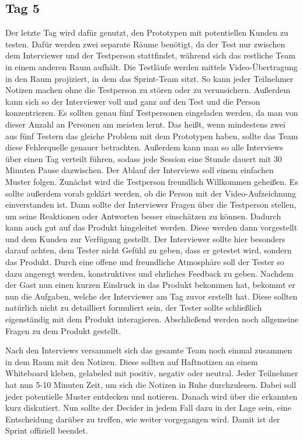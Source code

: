 \subsection*{Tag 5}
Der letzte Tag wird dafür genutzt, den Prototypen mit potentiellen Kunden zu testen. Dafür werden zwei separate Räume benötigt, da der Test nur zwischen dem Interviewer und der Testperson stattfindet, während sich das restliche Team in einem anderen Raum aufhält. Die Testläufe werden mittels Video-Übertragung in den Raum projiziert, in dem das Sprint-Team sitzt. So kann jeder Teilnehmer Notizen machen ohne die Testperson zu stören oder zu verunsichern. Außerdem kann sich so der Interviewer voll und ganz auf den Test und die Person konzentrieren. Es sollten genau fünf Testpersonen eingeladen werden, da man von dieser Anzahl an Personen am meisten lernt. Das heißt, wenn mindestens zwei aus fünf Testern das gleiche Problem mit dem Prototypen haben, sollte das Team diese Fehlerquelle genauer betrachten.
Außerdem kann man so alle Interviews über einen Tag verteilt führen, sodass jede Session eine Stunde dauert mit 30 Minuten Pause dazwischen. Der Ablauf der Interviews soll einem einfachen Muster folgen. Zunächst wird die Testperson freundlich Willkommen geheißen. Es sollte außerdem vorab geklärt werden, ob die Person mit der Video-Aufzeichnung einverstanden ist. Dann sollte der Interviewer Fragen über die Testperson stellen, um seine Reaktionen oder Antworten besser einschätzen zu können. Dadurch kann auch gut auf das Produkt hingeleitet werden. Diese werden dann vorgestellt und dem Kunden zur Verfügung gestellt. Der Interviewer sollte hier besonders darauf achten, dem Tester nicht Gefühl zu geben, dass er getestet wird, sondern das Produkt. Durch eine offene und freundliche Atmosphäre soll der Tester so dazu angeregt werden, konstruktives und ehrliches Feedback zu geben. Nachdem der Gast nun einen kurzen Eindruck in das Produkt bekommen hat, bekommt er nun die Aufgaben, welche der Interviewer am Tag zuvor erstellt hat. Diese sollten natürlich nicht zu detailliert formuliert sein, der Tester sollte schließlich eigenständig mit dem Produkt interagieren. Abschließend werden noch allgemeine Fragen zu dem Produkt gestellt.

Nach den Interviews versammelt sich das gesamte Team noch einmal zusammen in dem Raum mit den Notizen. Diese sollten auf Haftnotizen an einem Whiteboard kleben, gelabeled mit positiv, negativ oder neutral. Jeder Teilnehmer hat nun 5-10 Minuten Zeit, um sich die Notizen in Ruhe durchzulesen. Dabei soll jeder potentielle Muster entdecken und notieren. Danach wird über die erkannten kurz diskutiert. Nun sollte der Decider in jedem Fall dazu in der Lage sein, eine Entscheidung darüber zu treffen, wie weiter vorgegangen wird. Damit ist der Sprint offiziell beendet.

